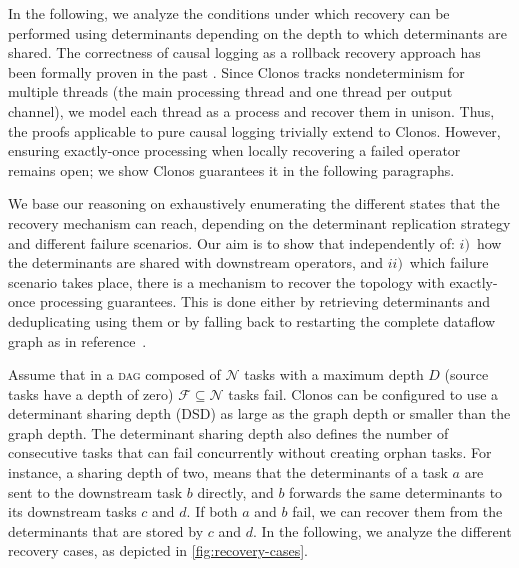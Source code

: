 \documentclass[sigconf]{acmart}
\begin{document}

In the following, we analyze the conditions under which recovery can be performed using determinants depending on the depth to which determinants are shared. The correctness of causal logging as a rollback recovery approach has been formally proven in the past \cite{alvisi1996understanding, alvisi1998message}. Since Clonos tracks nondeterminism for multiple threads (the main processing thread and one thread per output channel), we model each thread as a process and recover them in unison. Thus, the proofs applicable to pure causal logging trivially extend to Clonos. However, ensuring exactly-once processing when locally recovering a failed operator remains open;
we show Clonos guarantees it in the following paragraphs.

We base our reasoning on exhaustively enumerating the different states that the recovery mechanism can reach, depending on the determinant replication strategy and different failure scenarios. Our aim is to show that independently of: $i)$~how the determinants are shared with downstream operators, and $ii)$~which failure scenario takes place, there is a mechanism to recover the topology with exactly-once processing guarantees.
This is done either by retrieving determinants and deduplicating using them or by falling back to restarting the complete dataflow graph as in reference~\cite{CarboneEF17}.

Assume that in a \textsc{dag} composed of $\mathcal{N}$ tasks with a maximum depth $D$ (source tasks have a depth of zero) $\mathcal{F} \subseteq \mathcal{N}$ tasks fail. Clonos can be configured to use a determinant sharing depth (DSD) as large as the graph depth or smaller than the graph depth.
The determinant sharing depth also defines the number of consecutive tasks that can fail concurrently without creating orphan tasks. 
For instance, a sharing depth of two, means that the determinants of a task $a$ are sent to the downstream task $b$ directly, and $b$ forwards the same determinants to its downstream tasks $c$ and $d$. If both $a$ and $b$ fail, we can recover them from the determinants that are stored by $c$ and $d$. In the following, we analyze the different recovery cases, as depicted in \autoref{fig:recovery-cases}.
\end{document}
